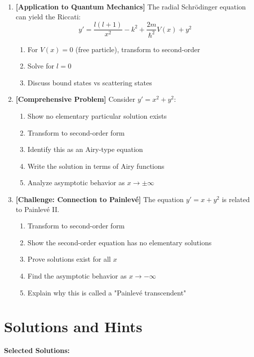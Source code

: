 \documentclass[12pt]{article}
\begin{document}
\begin{enumerate}[resume]
    \item \textbf{[Application to Quantum Mechanics]}
    The radial Schrödinger equation can yield the Riccati:
    $$y' = \frac{l(l+1)}{x^{2}} - k^{2} + \frac{2m}{\hbar^{2}}V(x) + y^{2}$$
    \begin{enumerate}[label=(\alph*)]
        \item For $V(x) = 0$ (free particle), transform to second-order
        \item Solve for $l = 0$
        \item Discuss bound states vs scattering states
    \end{enumerate}

    \item \textbf{[Comprehensive Problem]}
    Consider $y' = x^{2} + y^{2}$:
    \begin{enumerate}[label=(\alph*)]
        \item Show no elementary particular solution exists
        \item Transform to second-order form
        \item Identify this as an Airy-type equation
        \item Write the solution in terms of Airy functions
        \item Analyze asymptotic behavior as $x \to \pm\infty$
    \end{enumerate}

    \item \textbf{[Challenge: Connection to Painlevé]}
    The equation $y' = x + y^{2}$ is related to Painlevé II.
    \begin{enumerate}[label=(\alph*)]
        \item Transform to second-order form
        \item Show the second-order equation has no elementary solutions
        \item Prove solutions exist for all $x$
        \item Find the asymptotic behavior as $x \to -\infty$
        \item Explain why this is called a "Painlevé transcendent"
    \end{enumerate}
\end{enumerate}

\section*{Solutions and Hints}

\textbf{Selected Solutions:}
\end{document}

